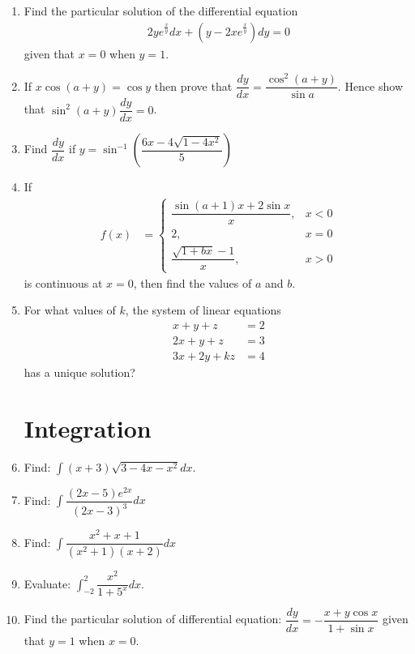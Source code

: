 \documentclass[10pt,-letter paper]{article}
\providecommand{\brak}[1]{\ensuremath{\left(#1\right)}}
\begin{document}
\begin{enumerate}
\item Find the particular solution of the differential equation
\begin{align*}
2ye^{\frac{x}{y}}dx + \brak{y - 2xe^{\frac{x}{y}}}dy = 0
\end{align*}
given that $x=0$ when $y=1$.

\item If $x\cos(a+y) = \cos{y}$ then prove that $\dfrac{dy}{dx} = \dfrac{\cos^2(a+y)}{\sin{a}}$. Hence show that $\sin^2(a+y)\dfrac{dy}{dx} = 0$.

\item Find $\dfrac{dy}{dx}$ if $y = \sin^{-1}\brak{\dfrac{6x - 4\sqrt{1-4x^2}}{5}}$

\item If \begin{align*}
		f(x) &= \begin{cases}\dfrac{\sin(a+1)x + 2\sin x}{x}, &x<0\\ 2, &x=0 \\ \dfrac{\sqrt{1+bx}-1}{x}, &x>0 \end{cases}\end{align*} is continuous at $x=0$, then find the values of $a$ and $b$.

\item For what values of $k$, the system of linear equations
\begin{align*}
x+y+z &= 2\\
2x+y+z &= 3\\
3x+2y+kz &= 4
\end{align*}
has a unique solution?

\section{Integration}

\item Find: $\int{\brak{x+3}\sqrt{3 - 4x - x^2}dx}$.

\item Find: $\int{\dfrac{(2x - 5)e^{2x}}{(2x-3)^3}dx}$

\item Find: $\int{\dfrac{x^2+x+1}{(x^2+1)(x+2)}dx}$

\item Evaluate: $\int_{-2}^{2}\dfrac{x^2}{1+5^x}dx$.

\item Find the particular solution of differential equation: $\dfrac{dy}{dx} = -\dfrac{x+y\cos{x}}{1+\sin{x}}$ given that $y = 1$ when $x=0$.


\end{enumerate}
\end{document}
